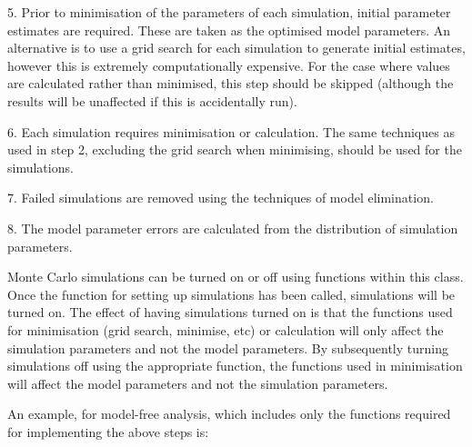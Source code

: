 5.  Prior to minimisation of the parameters of each simulation, initial parameter estimates are required.  These are taken as the optimised model parameters.  An alternative is to use a grid search for each simulation to generate initial estimates, however this is extremely computationally expensive.  For the case where values are calculated rather than minimised, this step should be skipped (although the results will be unaffected if this is accidentally run).


6.  Each simulation requires minimisation or calculation.  The same techniques as used in step 2, excluding the grid search when minimising, should be used for the simulations.


7.  Failed simulations are removed using the techniques of model elimination.


8.  The model parameter errors are calculated from the distribution of simulation parameters.


Monte Carlo simulations can be turned on or off using functions within this class.  Once the function for setting up simulations has been called, simulations will be turned on.  The effect of having simulations turned on is that the functions used for minimisation (grid search, minimise, etc) or calculation will only affect the simulation parameters and not the model parameters.  By subsequently turning simulations off using the appropriate function, the functions used in minimisation will affect the model parameters and not the simulation parameters.


An example, for model-free analysis, which includes only the functions required for implementing the above steps is:








